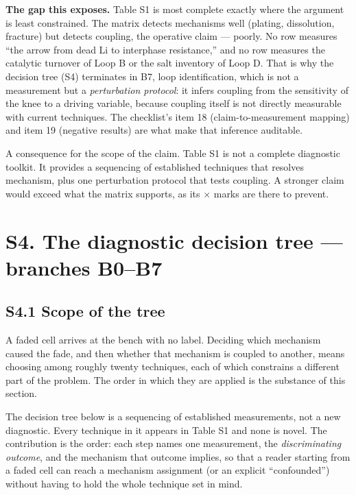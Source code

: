 \documentclass[11pt,a4paper]{article}
\begin{document}
\textbf{The gap this exposes.} Table S1 is most complete exactly where the argument is least constrained. The matrix detects mechanisms well (plating, dissolution, fracture) but detects coupling, the operative claim --- poorly. No row measures \textquotedblleft{}the arrow from dead Li to interphase resistance,\textquotedblright{} and no row measures the catalytic turnover of Loop B or the salt inventory of Loop D. That is why the decision tree (S4) terminates in B7, loop identification, which is not a measurement but a \emph{perturbation protocol}: it infers coupling from the sensitivity of the knee to a driving variable, because coupling itself is not directly measurable with current techniques. The checklist's item 18 (claim-to-measurement mapping) and item 19 (negative results) are what make that inference auditable.


A consequence for the scope of the claim. Table S1 is not a complete diagnostic toolkit. It provides a sequencing of established techniques that resolves mechanism, plus one perturbation protocol that tests coupling. A stronger claim would exceed what the matrix supports, as its \ensuremath{\boldsymbol{\times}} marks are there to prevent.


\section*{S4. The diagnostic decision tree --- branches B0--B7}


\subsection*{S4.1 Scope of the tree}


A faded cell arrives at the bench with no label. Deciding which mechanism caused the fade, and then whether that mechanism is coupled to another, means choosing among roughly twenty techniques, each of which constrains a different part of the problem. The order in which they are applied is the substance of this section.


The decision tree below is a sequencing of established measurements, not a new diagnostic. Every technique in it appears in Table S1 and none is novel. The contribution is the order: each step names one measurement, the \emph{discriminating outcome}, and the mechanism that outcome implies, so that a reader starting from a faded cell can reach a mechanism assignment (or an explicit \textquotedblleft{}confounded\textquotedblright{}) without having to hold the whole technique set in mind.
\end{document}
